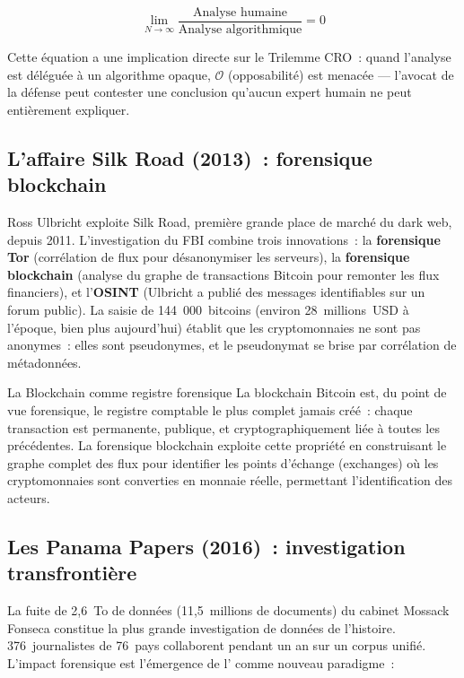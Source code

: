 \begin{equation}
\lim_{N \to \infty}
\frac{\text{Analyse humaine}}{\text{Analyse algorithmique}} = 0
\label{eq:bigdata}
\end{equation}

Cette équation a une implication directe sur le Trilemme CRO~: quand
l'analyse est déléguée à un algorithme opaque, $\mathcal{O}$ (opposabilité)
est menacée --- l'avocat de la défense peut contester une conclusion
qu'aucun expert humain ne peut entièrement expliquer.

\subsection{L'affaire Silk Road (2013)~: forensique blockchain}

Ross Ulbricht exploite Silk Road, première grande place de marché du dark
web, depuis 2011. L'investigation du FBI combine trois innovations~: la
\textbf{forensique Tor} (corrélation de flux pour désanonymiser les serveurs),
la \textbf{forensique blockchain} (analyse du graphe de transactions Bitcoin
pour remonter les flux financiers), et l'\textbf{OSINT} (Ulbricht a publié
des messages identifiables sur un forum public). La saisie de 144~000~bitcoins
(environ 28~millions~USD à l'époque, bien plus aujourd'hui) établit que
les cryptomonnaies ne sont pas anonymes~: elles sont pseudonymes, et le
pseudonymat se brise par corrélation de métadonnées.

\begin{boiteRemarque}{La Blockchain comme registre forensique}
La blockchain Bitcoin est, du point de vue forensique, le registre comptable
le plus complet jamais créé~: chaque transaction est permanente, publique,
et cryptographiquement liée à toutes les précédentes. La forensique blockchain
exploite cette propriété en construisant le graphe complet des flux pour
identifier les points d'échange (exchanges) où les cryptomonnaies sont
converties en monnaie réelle, permettant l'identification des acteurs.
\end{boiteRemarque}

\subsection{Les Panama Papers (2016)~: investigation transfrontière}

La fuite de 2,6~To de données (11,5~millions de documents) du cabinet
Mossack Fonseca constitue la plus grande investigation de données de
l'histoire. 376~journalistes de 76~pays collaborent pendant un an
sur un corpus unifié. L'impact forensique est l'émergence de
l'
comme nouveau paradigme~:

